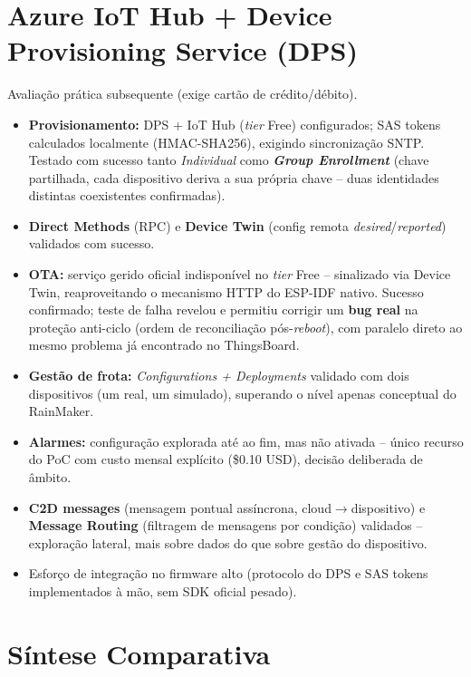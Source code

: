 \documentclass[a4paper,11pt]{article}
\begin{document}
\section{Azure IoT Hub + Device Provisioning Service (DPS)}
Avaliação prática subsequente (exige cartão de crédito/débito).
\begin{itemize}
    \item \textbf{Provisionamento:} DPS + IoT Hub (\textit{tier} Free) configurados; SAS tokens calculados localmente (HMAC-SHA256), exigindo sincronização SNTP. Testado com sucesso tanto \textit{Individual} como \textbf{\textit{Group Enrollment}} (chave partilhada, cada dispositivo deriva a sua própria chave -- duas identidades distintas coexistentes confirmadas).
    \item \textbf{Direct Methods} (RPC) e \textbf{Device Twin} (config remota \textit{desired}/\textit{reported}) validados com sucesso.
    \item \textbf{OTA:} serviço gerido oficial indisponível no \textit{tier} Free -- sinalizado via Device Twin, reaproveitando o mecanismo HTTP do ESP-IDF nativo. Sucesso confirmado; teste de falha revelou e permitiu corrigir um \textbf{bug real} na proteção anti-ciclo (ordem de reconciliação pós-\textit{reboot}), com paralelo direto ao mesmo problema já encontrado no ThingsBoard.
    \item \textbf{Gestão de frota:} \textit{Configurations + Deployments} validado com dois dispositivos (um real, um simulado), superando o nível apenas conceptual do RainMaker.
    \item \textbf{Alarmes:} configuração explorada até ao fim, mas não ativada -- único recurso do PoC com custo mensal explícito (\$0.10 USD), decisão deliberada de âmbito.
    \item \textbf{C2D messages} (mensagem pontual assíncrona, cloud$\rightarrow$dispositivo) e \textbf{Message Routing} (filtragem de mensagens por condição) validados -- exploração lateral, mais sobre dados do que sobre gestão do dispositivo.
    \item Esforço de integração no firmware alto (protocolo do DPS e SAS tokens implementados à mão, sem SDK oficial pesado).
\end{itemize}

\section{Síntese Comparativa}
\end{document}

